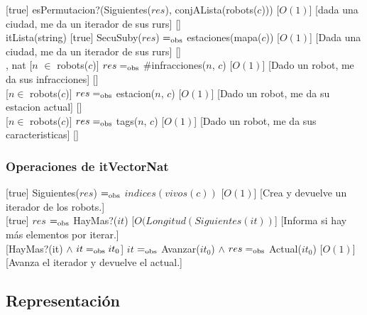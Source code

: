   [true]
  {esPermutacion?(Siguientes($res$), conjALista(robots($c$)))}
  [$O(1)$]
  [dada una ciudad, me da un iterador de sus rurs]
  [] \\  

   {itLista(string)}
  [true]
  {SecuSuby($res$) $=_{\mathrm{obs}}$ estaciones(mapa($c$))}
  [$O(1)$]
  [Dada una ciudad, me da un iterador de sus rurs]
  [] \\  

   {, }{nat}
  [$n$ $\in$ robots($c$)]
  {$res =_{\mathrm{obs}}$ \#infracciones($n$, $c$)}
  [$O(1)$]
  [Dado un robot, me da sus infracciones]
  [] \\  

  [$n \in$ robots($c$)]
  {$res =_{\mathrm{obs}}$ estacion($n$, $c$)}
  [$O(1)$]
  [Dado un robot, me da su estacion actual]
  [] \\  

  [$n \in$ robots($c$)]
  {$res =_{\mathrm{obs}}$ tags($n$, $c$)}
  [$O(1)$]
  [Dado un robot, me da sus caracteristicas]
  [] \\  

  \subsubsection{Operaciones de itVectorNat}

  [true]
  {Siguientes($res$) $=_{\mathrm{obs}}$ $indices(vivos(c))$}
  [$O(1)$]
  [Crea y devuelve un iterador de los robots.]\\

  [true]
  {$res$ $=_{\mathrm{obs}}$ HayMas?($it$)}
  [$O(Longitud(Siguientes(it))$]
  [Informa si hay m\'as elementos por iterar.]\\
  
  [HayMas?(it) $\land$ $it =_{\mathrm{obs}} it_0$]
  {$it$ $=_{\mathrm{obs}}$ Avanzar($it_0$) $\land$ $res =_{\mathrm{obs}}$ Actual($it_0$)}
  [$O(1)$]
  [Avanza el iterador y devuelve el actual.]\\

\subsection{Representaci\'on}

